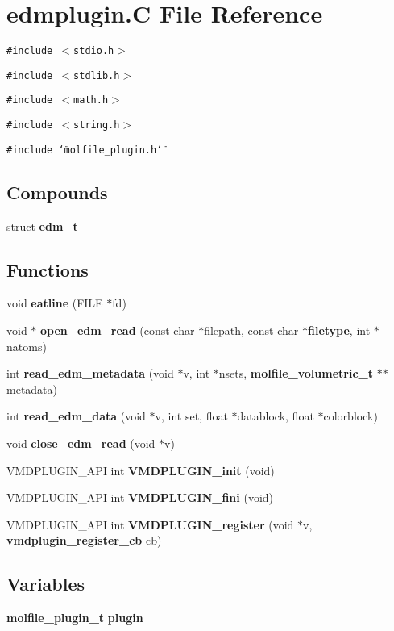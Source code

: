 \section{edmplugin.C File Reference}
\label{edmplugin_8C}
{\tt \#include $<$stdio.h$>$}\par
{\tt \#include $<$stdlib.h$>$}\par
{\tt \#include $<$math.h$>$}\par
{\tt \#include $<$string.h$>$}\par
{\tt \#include \char`\"{}molfile\_\-plugin.h\char`\"{}}\par
\subsection*{Compounds}
\begin{CompactItemize}
\item 
struct {\bf edm\_\-t}
\end{CompactItemize}
\subsection*{Functions}
\begin{CompactItemize}
\item 
void {\bf eatline} (FILE $\ast$fd)
\item 
void $\ast$ {\bf open\_\-edm\_\-read} (const char $\ast$filepath, const char $\ast${\bf filetype}, int $\ast$natoms)
\item 
int {\bf read\_\-edm\_\-metadata} (void $\ast$v, int $\ast$nsets, {\bf molfile\_\-volumetric\_\-t} $\ast$$\ast$metadata)
\item 
int {\bf read\_\-edm\_\-data} (void $\ast$v, int set, float $\ast$datablock, float $\ast$colorblock)
\item 
void {\bf close\_\-edm\_\-read} (void $\ast$v)
\item 
VMDPLUGIN\_\-API int {\bf VMDPLUGIN\_\-init} (void)
\item 
VMDPLUGIN\_\-API int {\bf VMDPLUGIN\_\-fini} (void)
\item 
VMDPLUGIN\_\-API int {\bf VMDPLUGIN\_\-register} (void $\ast$v, {\bf vmdplugin\_\-register\_\-cb} cb)
\end{CompactItemize}
\subsection*{Variables}
\begin{CompactItemize}
\item 
{\bf molfile\_\-plugin\_\-t} {\bf plugin}
\end{CompactItemize}



